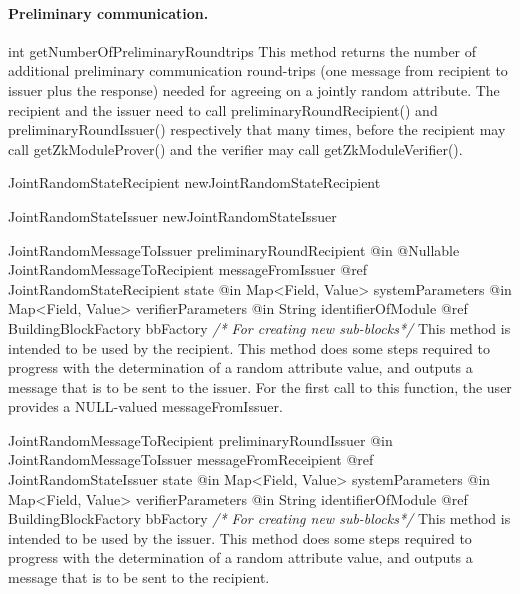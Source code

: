     \paragraph{Preliminary communication.}
      \begin{getter}
      {int}
      {getNumberOfPreliminaryRoundtrips}
      This method returns the number of additional preliminary communication round-trips
      (one message from recipient to issuer plus the response) needed for
      agreeing on a jointly random attribute.
      The recipient and the issuer need to call preliminaryRoundRecipient() and
      preliminaryRoundIssuer() respectively that many times, before the recipient may
      call getZkModuleProver() and the verifier may call getZkModuleVerifier().
      \end{getter}
      \begin{getter}
      {JointRandomStateRecipient}
      {newJointRandomStateRecipient}
      \end{getter}
      \begin{getter}
      {JointRandomStateIssuer}
      {newJointRandomStateIssuer}
      \end{getter}
      \begin{method}
      {JointRandomMessageToIssuer}
      {preliminaryRoundRecipient}
      {
        {@in @Nullable JointRandomMessageToRecipient messageFromIssuer}
        {@ref JointRandomStateRecipient state}
        {@in Map<Field, Value> systemParameters}
        {@in Map<Field, Value> verifierParameters}
        {@in String identifierOfModule}
        {@ref BuildingBlockFactory bbFactory \textrm{\emph{/* For creating new sub-blocks*/}}}
      }
      This method is intended to be used by the recipient.
      This method does some steps required to progress with the determination of
      a random attribute value,
      and outputs a message that is to be sent to the issuer.
      For the first call to this function, the user provides a NULL-valued messageFromIssuer.
      \end{method}
      \begin{method}
      {JointRandomMessageToRecipient}
      {preliminaryRoundIssuer}
      {
        {@in JointRandomMessageToIssuer messageFromReceipient}
        {@ref JointRandomStateIssuer state}
        {@in Map<Field, Value> systemParameters}
        {@in Map<Field, Value> verifierParameters}
        {@in String identifierOfModule}
        {@ref BuildingBlockFactory bbFactory \textrm{\emph{/* For creating new sub-blocks*/}}}
      }
      This method is intended to be used by the issuer.
      This method does some steps required to progress with the determination of
      a random attribute value,
      and outputs a message that is to be sent to the recipient.
      \end{method}

